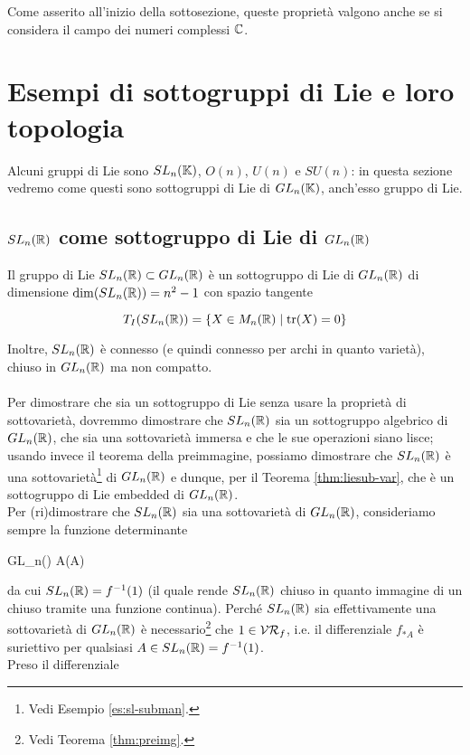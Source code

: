Come asserito all'inizio della sottosezione, queste proprietà valgono anche se si considera il campo dei numeri complessi $ \mathbb{C} $.

\section{Esempi di sottogruppi di Lie e loro topologia}

Alcuni gruppi di Lie sono $ SL_{n}(\mathbb{K}) $, $ O(n) $, $ U(n) $ e $ SU(n) $: in questa sezione vedremo come questi sono sottogruppi di Lie di $ GL_{n}(\mathbb{K}) $, anch'esso gruppo di Lie.

\subsection{$ SL_{n}(\mathbb{R}) $ come sottogruppo di Lie di $ GL_{n}(\mathbb{R}) $}\label{SL-sublie}

Il gruppo di Lie $ SL_{n}(\mathbb{R}) \subset GL_{n}(\mathbb{R}) $ è un sottogruppo di Lie di $ GL_{n}(\mathbb{R}) $ di dimensione $ \dim(SL_{n}(\mathbb{R})) = n^{2} - 1 $ con spazio tangente

\begin{equation}
	T_{I}(SL_{n}(\mathbb{R})) = \{ X \in M_{n}(\mathbb{R}) \mid \tr(X) = 0 \}
\end{equation}

Inoltre, $ SL_{n}(\mathbb{R}) $ è connesso (e quindi connesso per archi in quanto varietà), chiuso in $ GL_{n}(\mathbb{R}) $ ma non compatto.\\\\
%
Per dimostrare che sia un sottogruppo di Lie senza usare la proprietà di sottovarietà, dovremmo dimostrare che $ SL_{n}(\mathbb{R}) $ sia un sottogruppo algebrico di $ GL_{n}(\mathbb{R}) $, che sia una sottovarietà immersa e che le sue operazioni siano lisce; usando invece il teorema della preimmagine, possiamo dimostrare che $ SL_{n}(\mathbb{R}) $ è una sottovarietà\footnote{%
	Vedi Esempio \ref{es:sl-subman}.%
} di $ GL_{n}(\mathbb{R}) $ e dunque, per il Teorema \ref{thm:liesub-var}, che è un sottogruppo di Lie embedded di $ GL_{n}(\mathbb{R}) $.\\
Per (ri)dimostrare che $ SL_{n}(\mathbb{R}) $ sia una sottovarietà di $ GL_{n}(\mathbb{R}) $, consideriamo sempre la funzione determinante

	{GL_{n}(\R)}{\R}
	{A}{\det(A)}
	
da cui $ SL_{n}(\mathbb{R}) = f^{-1}(1) $ (il quale rende $ SL_{n}(\mathbb{R}) $ chiuso in quanto immagine di un chiuso tramite una funzione continua). Perché $ SL_{n}(\mathbb{R}) $ sia effettivamente una sottovarietà di $ GL_{n}(\mathbb{R}) $ è necessario\footnote{%
	Vedi Teorema \ref{thm:preimg}.%
} che $ 1 \in \mathcal{VR}_{f} $, i.e. il differenziale $ f_{*A} $ è suriettivo per qualsiasi $ A \in SL_{n}(\mathbb{R}) = f^{-1}(1) $.\\
Preso il differenziale

